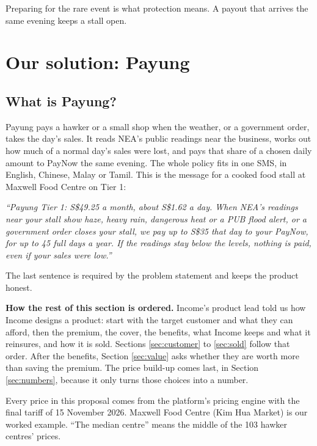 \documentclass[11pt,a4paper]{article}
\newcommand{\sgd}{\textup{S\$}}
\begin{document}
Preparing for the rare event is what protection means. A payout that arrives the same evening keeps a stall open.

\section{Our solution: Payung}\label{sec:solution}

\subsection{What is Payung?}\label{sec:what}

Payung pays a hawker or a small shop when the weather, or a government order, takes the day's sales. It reads NEA's public readings near the business, works out how much of a normal day's sales were lost, and pays that share of a chosen daily amount to PayNow the same evening. The whole policy fits in one SMS, in English, Chinese, Malay or Tamil. This is the message for a cooked food stall at Maxwell Food Centre on Tier 1:

\begin{tcolorbox}[colback=soft,colframe=soft,arc=2pt,left=8pt,right=8pt,top=4pt,bottom=4pt]
\itshape ``Payung Tier 1: \sgd 49.25 a month, about \sgd 1.62 a day. When NEA's readings near your stall show haze, heavy rain, dangerous heat or a PUB flood alert, or a government order closes your stall, we pay up to \sgd 35 that day to your PayNow, for up to 45 full days a year. If the readings stay below the levels, nothing is paid, even if your sales were low.''
\end{tcolorbox}

The last sentence is required by the problem statement and keeps the product honest.\cite{ps}

\textbf{How the rest of this section is ordered.} Income's product lead told us how Income designs a product: start with the target customer and what they can afford, then the premium, the cover, the benefits, what Income keeps and what it reinsures, and how it is sold.\cite{income-qa} Sections \ref{sec:customer} to \ref{sec:sold} follow that order. After the benefits, Section \ref{sec:value} asks whether they are worth more than saving the premium. The price build-up comes last, in Section \ref{sec:numbers}, because it only turns those choices into a number.

Every price in this proposal comes from the platform's pricing engine with the final tariff of 15 November 2026. Maxwell Food Centre (Kim Hua Market) is our worked example. ``The median centre'' means the middle of the 103 hawker centres' prices.
\end{document}
